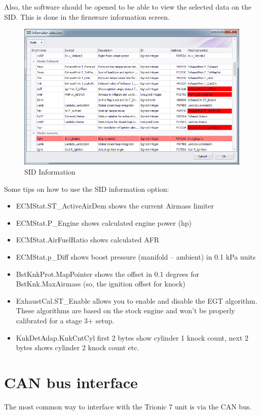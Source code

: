 \documentclass[11pt,a4paper]{book}
\begin{document}
Also, the software should be opened to be able to view the selected data on the SID. This is done in
the firmware information screen.
\begin{figure}
    \centering
    \includegraphics[width=.9\linewidth]{sid.png}
    \caption{SID Information}
    \label{fig:}
\end{figure}

Some tips on how to use the SID information option:
\begin{itemize}
    \item
        ECMStat.ST\_ActiveAirDem shows the current Airmass limiter
    \item
        ECMStat.P\_Engine shows calculated engine power (hp)
    \item
        ECMStat.AirFuelRatio shows calculated AFR
    \item
        ECMStat.p\_Diff shows boost pressure (manifold – ambient) in 0.1 kPa units
    \item
        BstKnkProt.MapPointer shows the offset in 0.1 degrees for BstKnk.MaxAirmass (so, the
        ignition offset for knock)
    \item
        ExhaustCal.ST\_Enable allows you to enable and disable the EGT algorithm. These algorithms
        are based on the stock engine and won’t be properly calibrated for a stage 3+ setup.
    \item
        KnkDetAdap.KnkCntCyl first 2 bytes show cylinder 1 knock count, next 2 bytes shows cylinder
        2 knock count etc.
\end{itemize}

\chapter{CAN bus interface}
The most common way to interface with the Trionic 7 unit is via the CAN
bus.
\end{document}
